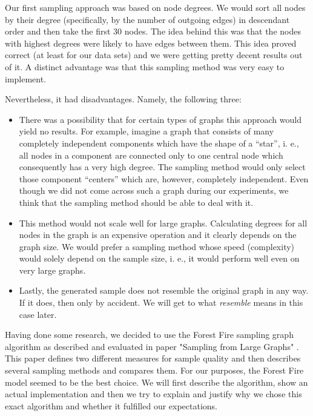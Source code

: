 Our first sampling approach was based on node degrees. We would sort all nodes by their degree (specifically, by the number of outgoing edges) in descendant order and then take the first 30 nodes. The idea behind this was that the nodes with highest degrees were likely to have edges between them. This idea proved correct (at least for our data sets) and we were getting pretty decent results out of it. A distinct advantage was that this sampling method was very easy to implement.

Nevertheless, it had disadvantages. Namely, the following three:

\begin{itemize}
\item There was a possibility that for certain types of graphs this approach would yield no results. For example, imagine a graph that consists of many completely independent components which have the shape of a “star”, i. e., all nodes in a component are connected only to one central node which consequently has a very high degree. The sampling method would only select those component “centers” which are,  however, completely independent. Even though we did not come across such a graph during our experiments, we think that the sampling method should be able to deal with it.
\item This method would not scale well for large graphs. Calculating degrees for all nodes in the graph is an expensive operation and it clearly depends on the graph size. We would prefer a sampling method whose speed (complexity) would solely depend on the sample size, i. e., it would perform well even on very large graphs.
\item Lastly, the generated sample does not resemble the original graph in any way. If it does, then only by accident. We will get to what \emph{resemble} means in this case later.

\end{itemize}

Having done some research, we decided to use the Forest Fire sampling graph algorithm as described and evaluated in paper "Sampling from Large Graphs" \cite{leskovec2006sampling}. This paper defines two different measures for sample quality and then describes several sampling methods and compares them. For our purposes, the Forest Fire model seemed to be the best choice. We will first describe the algorithm, show an actual implementation and then we try to explain and justify why we chose this exact algorithm and whether it fulfilled our expectations.

